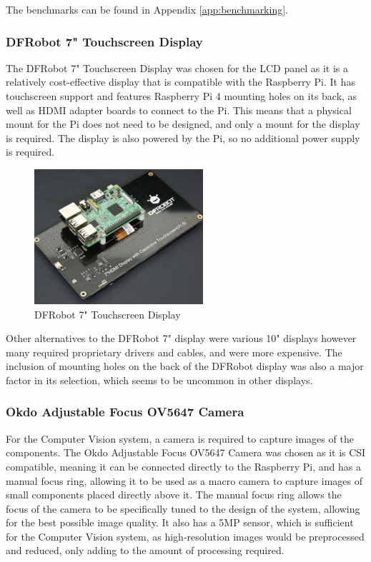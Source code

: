 The benchmarks can be found in Appendix \autoref{app:benchmarking}.

\subsubsection{DFRobot 7" Touchscreen Display}
The DFRobot 7" Touchscreen Display was chosen for the LCD panel as it is a relatively cost-effective display that is compatible with the Raspberry Pi. It has touchscreen support and features Raspberry Pi 4 mounting holes on its back, as well as HDMI adapter boards to connect to the Pi. This means that a physical mount for the Pi does not need to be designed, and only a mount for the display is required. The display is also powered by the Pi, so no additional power supply is required. 

\begin{figure}[H]
    \begin{minipage}[t]{\textwidth}
      \centering
      \includegraphics[width=\textwidth,height=5cm, keepaspectratio]{imgs/parts/dfrobot_screen.jpg}
      \caption{DFRobot 7" Touchscreen Display \cite{7inchdisplay}}
    \end{minipage}
\end{figure}

Other alternatives to the DFRobot 7" display were various 10" displays however many required proprietary drivers and cables, and were more expensive. The inclusion of mounting holes on the back of the DFRobot display was also a major factor in its selection, which seems to be uncommon in other displays.

\subsubsection{Okdo Adjustable Focus OV5647 Camera}
For the Computer Vision system, a camera is required to capture images of the components. The Okdo Adjustable Focus OV5647 Camera was chosen as it is CSI compatible, meaning it can be connected directly to the Raspberry Pi, and has a manual focus ring, allowing it to be used as a macro camera to capture images of small components placed directly above it. The manual focus ring allows the focus of the camera to be specifically tuned to the design of the system, allowing for the best possible image quality. It also has a 5MP sensor\cite{okdospec}, which is sufficient for the Computer Vision system, as high-resolution images would be preprocessed and reduced, only adding to the amount of processing required.


